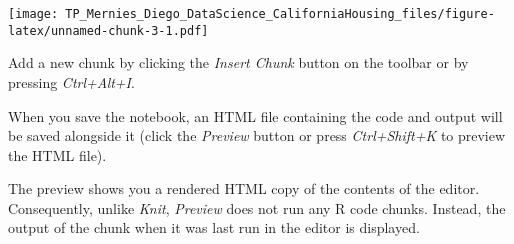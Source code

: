 \documentclass[]{article}
\begin{document}
\texttt{[image: TP\_Mernies\_Diego\_DataScience\_CaliforniaHousing\_files/figure-latex/unnamed-chunk-3-1.pdf]}

Add a new chunk by clicking the \emph{Insert Chunk} button on the
toolbar or by pressing \emph{Ctrl+Alt+I}.

When you save the notebook, an HTML file containing the code and output
will be saved alongside it (click the \emph{Preview} button or press
\emph{Ctrl+Shift+K} to preview the HTML file).

The preview shows you a rendered HTML copy of the contents of the
editor. Consequently, unlike \emph{Knit}, \emph{Preview} does not run
any R code chunks. Instead, the output of the chunk when it was last run
in the editor is displayed.
\end{document}
